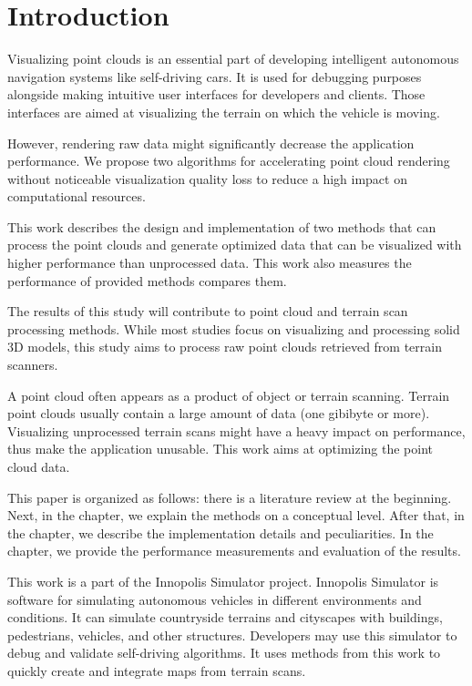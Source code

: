 \chapter{Introduction}
\label{chap:introduction}

Visualizing point clouds is an essential part of developing intelligent autonomous navigation systems like self-driving cars. It is used for debugging purposes alongside making intuitive user interfaces for developers and clients. Those interfaces are aimed at visualizing the terrain on which the vehicle is moving.

However, rendering raw data might significantly decrease the application performance. We propose two algorithms for accelerating point cloud rendering without noticeable visualization quality loss to reduce a high impact on computational resources.

This work describes the design and implementation of two methods that can process the point clouds and generate optimized data that can be visualized with higher performance than unprocessed data. This work also measures the performance of provided methods compares them.

The results of this study will contribute to point cloud and terrain scan processing methods. While most studies focus on visualizing and processing solid 3D models, this study aims to process raw point clouds retrieved from terrain scanners.

A point cloud often appears as a product of object or terrain scanning. Terrain point clouds usually contain a large amount of data (one gibibyte or more). Visualizing unprocessed terrain scans might have a heavy impact on performance, thus make the application unusable. This work aims at optimizing the point cloud data.

This paper is organized as follows: there is a literature review at the beginning. Next, in the  chapter, we explain the methods on a conceptual level. After that, in the  chapter, we describe the implementation details and peculiarities. In the  chapter, we provide the performance measurements and evaluation of the results.

This work is a part of the Innopolis Simulator project. Innopolis Simulator is software for simulating autonomous vehicles in different environments and conditions. It can simulate countryside terrains and cityscapes with buildings, pedestrians, vehicles, and other structures. Developers may use this simulator to debug and validate self-driving algorithms. It uses methods from this work to quickly create and integrate maps from terrain scans.
